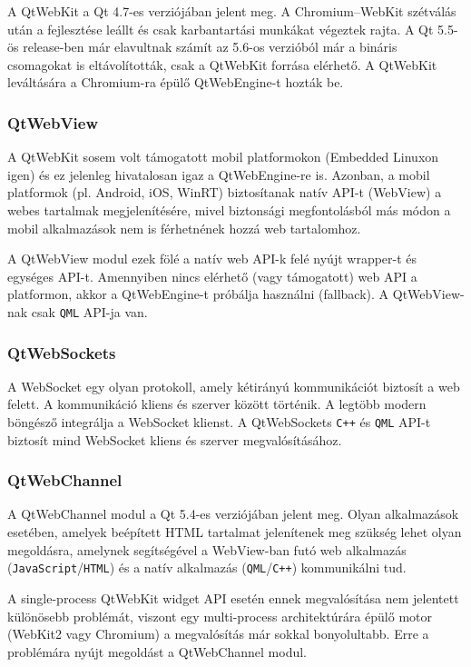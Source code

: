 \documentclass[12pt]{report}
\begin{document}
A QtWebKit a Qt 4.7-es verziójában jelent meg. A Chromium--WebKit szétválás után a
fejlesztése leállt és csak karbantartási munkákat végeztek rajta. A Qt 5.5-ös release-ben
már elavultnak számít az 5.6-os verzióból már a bináris csomagokat is eltávolították, csak
a QtWebKit forrása elérhető. A QtWebKit leváltására a Chromium-ra épülő QtWebEngine-t
hozták be.

\subsubsection{QtWebView}
A QtWebKit sosem volt támogatott mobil platformokon (Embedded Linuxon igen) és ez jelenleg
hivatalosan igaz a QtWebEngine-re is. Azonban, a mobil platformok (pl. Android, iOS, WinRT)
biztosítanak natív API-t (WebView) a webes tartalmak megjelenítésére, mivel biztonsági
megfontolásból más módon a mobil alkalmazások nem is férhetnének hozzá web tartalomhoz.

A QtWebView modul ezek fölé a natív web API-k felé nyújt wrapper-t és egységes API-t.
Amennyiben nincs elérhető (vagy támogatott) web API a platformon, akkor a QtWebEngine-t
próbálja használni (fallback). A QtWebView-nak csak \texttt{QML} API-ja van.
\cite{bib:qt-doc-qt-webview}

\subsubsection{QtWebSockets}
A WebSocket egy olyan protokoll, amely kétirányú kommunikációt biztosít a web felett.
A kommunikáció kliens és szerver között történik.
A legtöbb modern böngésző integrálja a WebSocket klienst. A QtWebSockets \texttt{C++} és
\texttt{QML} API-t biztosít mind WebSocket kliens és szerver megvalósításához.
\cite{bib:qt-doc-qt-websockets}

\subsubsection{QtWebChannel}
A QtWebChannel modul a Qt 5.4-es verziójában jelent meg. Olyan alkalmazások esetében,
amelyek beépített HTML tartalmat jelenítenek meg szükség lehet olyan megoldásra,
amelynek segítségével a WebView-ban futó web alkalmazás (\texttt{JavaScript}/\texttt{HTML})
és a natív alkalmazás (\texttt{QML}/\texttt{C++}) kommunikálni tud.

A single-process QtWebKit widget API esetén ennek megvalósítása nem jelentett különösebb
problémát, viszont egy multi-process architektúrára épülő motor (WebKit2 vagy Chromium)
a megvalósítás már sokkal bonyolultabb. Erre a problémára nyújt megoldást a QtWebChannel
modul.
\end{document}
